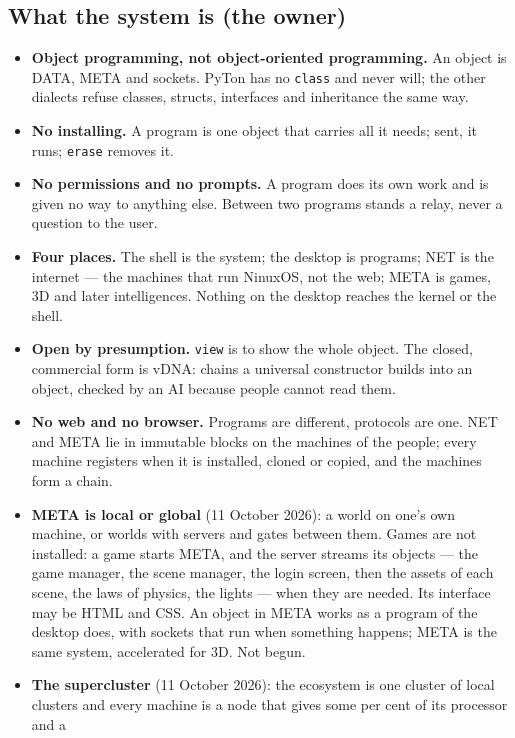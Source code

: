 \documentclass[11pt,a4paper]{article}
\newcommand{\cmd}[1]{\texttt{#1}}
\begin{document}
\subsection{What the system is (the owner)}
\begin{itemize}
\item \textbf{Object programming, not object-oriented programming.} An object is DATA, META
      and sockets. PyTon has no \texttt{class} and never will; the other dialects refuse
      classes, structs, interfaces and inheritance the same way.
\item \textbf{No installing.} A program is one object that carries all it needs; sent, it
      runs; \cmd{erase} removes it.
\item \textbf{No permissions and no prompts.} A program does its own work and is given no way
      to anything else. Between two programs stands a relay, never a question to the user.
\item \textbf{Four places.} The shell is the system; the desktop is programs; NET is the
      internet --- the machines that run NinuxOS, not the web; META is games, 3D and later
      intelligences. Nothing on the desktop reaches the kernel or the shell.
\item \textbf{Open by presumption.} \cmd{view} is to show the whole object. The closed,
      commercial form is vDNA: chains a universal constructor builds into an object, checked
      by an AI because people cannot read them.
\item \textbf{No web and no browser.} Programs are different, protocols are one. NET and META
      lie in immutable blocks on the machines of the people; every machine registers when it
      is installed, cloned or copied, and the machines form a chain.
\item \textbf{META is local or global} (11 October 2026): a world on one's own machine, or
      worlds with servers and gates between them. Games are not installed: a game starts
      META, and the server streams its objects --- the game manager, the scene manager, the
      login screen, then the assets of each scene, the laws of physics, the lights --- when
      they are needed. Its interface may be HTML and CSS. An object in META works as a
      program of the desktop does, with sockets that run when something happens; META is the
      same system, accelerated for 3D. Not begun.
\item \textbf{The supercluster} (11 October 2026): the ecosystem is one cluster of local
      clusters and every machine is a node that gives some per cent of its processor and a

\end{itemize}
\end{document}
